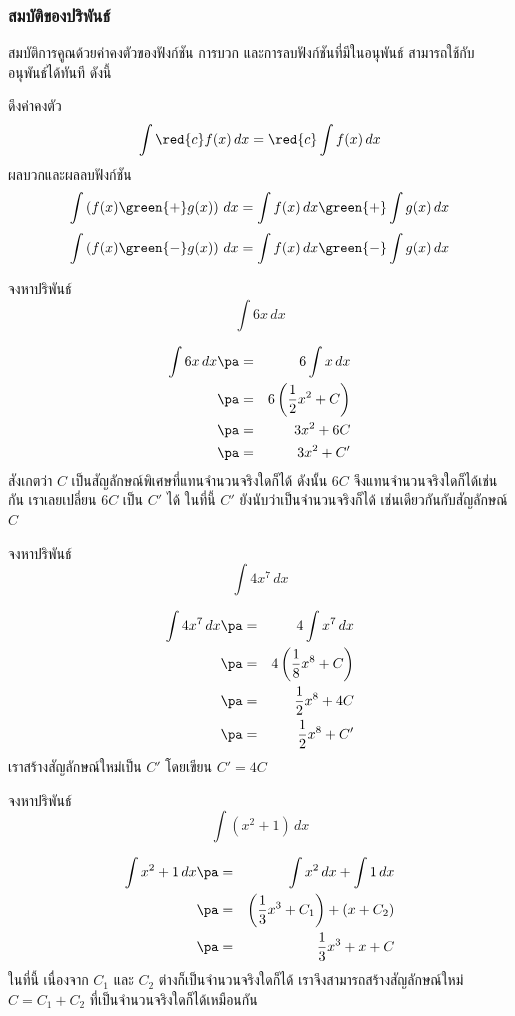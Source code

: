 \begin{frame}
\frametitle{สมบัติของปริพันธ์}
สมบัติการคูณด้วยค่าคงตัวของฟังก์ชัน การบวก และการลบฟังก์ชันที่มีในอนุพันธ์ สามารถใช้กับอนุพันธ์ได้ทันที ดังนี้
\begin{prop}{}{}
ดึงค่าคงตัว 
\[ \int \red{c} f(x) \, dx = \red{c} \int f(x) \, dx \]
ผลบวกและผลลบฟังก์ชัน
\[ \int \left( f(x) \green{+} g(x) \right)\, dx = \int f(x) \, dx \green{+} \int g(x) \, dx\]
\[ \int \left( f(x) \green{-} g(x)\right) \, dx = \int f(x) \, dx \green{-} \int g(x) \, dx\] 
\end{prop}
\end{frame}

\begin{frame}[t]
\begin{ex}
จงหาปริพันธ์
\[\int 6x\,dx\]
\end{ex}
\begin{sol}
\begin{eqnarray*}
\int 6x \, dx \pa &=& 6 \int x \, dx \\ \pa
&=& 6 \left(\frac{1}{2}x^2+C\right) \\ \pa
&=& 3x^2 + 6C \\ \pa 
&=& 3x^2 + C'
\end{eqnarray*}
สังเกตว่า $C$ เป็นสัญลักษณ์พิเศษที่แทนจำนวนจริงใดก็ได้ ดังนั้น $6C$ จึงแทนจำนวนจริงใดก็ได้เช่นกัน เราเลยเปลี่ยน $6C$ เป็น $C'$ ได้ ในที่นี้ $C'$ ยังนับว่าเป็นจำนวนจริงก็ได้ เช่นเดียวกันกับสัญลักษณ์ $C$
\end{sol}
\end{frame}


\begin{frame}[t]
\begin{ex}
จงหาปริพันธ์
\[\int 4x^7\,dx\]
\end{ex}
\begin{sol}
\begin{eqnarray*}
\int 4x^7 \, dx \pa &=& 4 \int x^7 \, dx \\ \pa
&=& 4\left( \frac{1}{8}x^8 + C \right) \\ \pa
&=& \frac{1}{2}x^8 + 4C \\ \pa
&=& \frac{1}{2}x^8 + C'
\end{eqnarray*}
เราสร้างสัญลักษณ์ใหม่เป็น $C'$ โดยเขียน $C' = 4C$
\end{sol}
\end{frame}


\begin{frame}[t]
\begin{ex}
จงหาปริพันธ์
\[\int (x^2 + 1 )\,dx\]
\end{ex}
\begin{sol}
\begin{eqnarray*}
\int x^2 + 1 \, dx \pa &=& \int x^2 \, dx + \int 1 \, dx \\
\pa &=& \left(\frac{1}{3}x^3 + C_1\right) + (x + C_2) \\
\pa &=& \frac{1}{3}x^3 + x + C
\end{eqnarray*}
ในที่นี้ เนื่องจาก $C_1$ และ $C_2$ ต่างก็เป็นจำนวนจริงใดก็ได้ เราจึงสามารถสร้างสัญลักษณ์ใหม่ $C = C_1 + C_2$ ที่เป็นจำนวนจริงใดก็ได้เหมือนกัน
\end{sol}
\end{frame}


